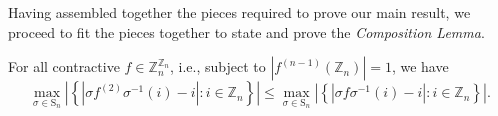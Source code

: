 Having assembled together the pieces required to prove our main result, we proceed to fit the pieces together to state and prove the \textit{Composition Lemma}.
\begin{lemma}\label{lem:composition-lemma}
 For all contractive  $f\in\mathbb{Z}_{n}^{\mathbb{Z}_{n}}$, i.e., subject to 
$\left|f^{\left(n-1\right)}\left(\mathbb{Z}_{n}\right)\right|=1$,
we have
\begin{equation}\label{eq:composition-lemma}
\max_{\sigma\in\text{S}_{n}}\left|\left\{ \left|\sigma f^{(2)}\sigma^{-1}(i)-i\right|:i\in\mathbb{Z}_{n}\right\} \right|\le\max_{\sigma\in\text{S}_{n}}\left|\left\{ \left|\sigma f\sigma^{-1}(i)-i\right|:i\in\mathbb{Z}_{n}\right\} \right|.\end{equation}
\end{lemma}
